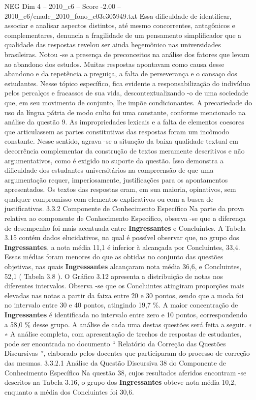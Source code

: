 \begin{textsample}{NEG Dim 4 – 2010\_c6 – Score -2.00 – 2010\_c6/enade\_2010\_fono\_c03e305949.txt}
Essa dificuldade de identificar, associar e analisar aspectos distintos, até mesmo concorrentes, antagônicos e complementares, denuncia a fragilidade de um pensamento simplificador que a qualidade das respostas revelou ser ainda hegemônico nas universidades brasileiras.
Notou -se a presença de preconceitos na análise dos fatores que levam ao abandono dos estudos.
Muitas respostas apontavam como causa desse abandono e da repetência a preguiça, a falta de perseverança e o cansaço dos estudantes.
Nesse tópico específico, fica evidente a responsabilização do indivíduo pelos percalços e fracassos de sua vida, descontextualizando -o de uma sociedade que, em seu movimento de conjunto, lhe impõe condicionantes.
A precariedade do uso da língua pátria de modo culto foi uma constante, conforme mencionado na análise da questão 9.
As impropriedades lexicais e a falta de elementos coesores que articulassem as partes constitutivas das respostas foram um incômodo constante.
Nesse sentido, agrava -se a situação da baixa qualidade textual em decorrência complementar da construção de textos meramente descritivos e não argumentativos, como é exigido no suporte da questão.
Isso demonstra a dificuldade dos estudantes universitários na compreensão de que uma argumentação requer, imperiosamente, justificações para os apontamentos apresentados.
Os textos das respostas eram, em sua maioria, opinativos, sem qualquer compromisso com elementos explicativos ou com a busca de justificativas. 3.3.2 Componente de Conhecimento Específico Na parte da prova relativa ao componente de Conhecimento Específico, observa -se que a diferença de desempenho foi mais acentuada entre \textbf{Ingressantes} e Concluintes.
A Tabela 3.15 contém dados elucidativos, na qual é possível observar que, no grupo dos \textbf{Ingressantes}, a nota média 11,1 é inferior à alcançada por Concluintes, 33,4.
Essas médias foram menores do que as obtidas no conjunto das questões objetivas, nas quais \textbf{Ingressantes} alcançaram nota média 36,6, e Concluintes, 52,1 ( Tabela 3.8 ).
O Gráfico 3.12 apresenta a distribuição de notas nos diferentes intervalos.
Observa -se que os Concluintes atingiram proporções mais elevadas nas notas a partir da faixa entre 20 e 30 pontos, sendo que a moda foi no intervalo entre 30 e 40 pontos, atingindo 19,7 \%.
A maior concentração de \textbf{Ingressantes} é identificada no intervalo entre zero e 10 pontos, correspondendo a 58,0 \% desse grupo.
A análise de cada uma destas questões será feita a seguir. ∗ ∗ A análise completa, com apresentação de trechos de respostas de estudantes, pode ser encontrada no documento “ Relatório da Correção das Questões Discursivas ”, elaborado pelos docentes que participaram do processo de correção das mesmas. 3.3.2.1 Análise da Questão Discursiva 38 do Componente de Conhecimento Específico Na questão 38, cujos resultados aferidos encontram -se descritos na Tabela 3.16, o grupo dos \textbf{Ingressantes} obteve nota média 10,2, enquanto a média dos Concluintes foi 30,6.

\end{textsample}
